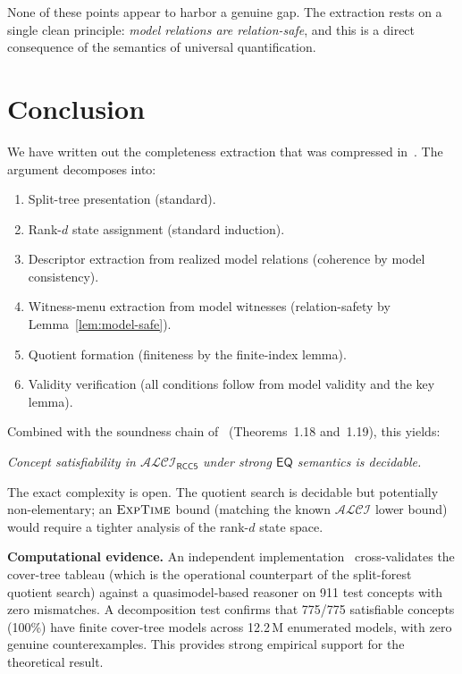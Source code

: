 \documentclass[11pt]{article}
\theoremstyle{definition}
\theoremstyle{remark}
\newcommand{\EQ}{\mathsf{EQ}}
\newcommand{\ALCIRCC}[1]{\mathcal{ALCI}_{\mathsf{RCC#1}}}
\begin{document}
None of these points appear to harbor a genuine gap.  The extraction
rests on a single clean principle: \emph{model relations are
relation-safe}, and this is a direct consequence of the semantics of
universal quantification.


\section{Conclusion}
\label{sec:conclusion}

We have written out the completeness extraction that was compressed
in~\cite{SplitForest}.  The argument decomposes into:
\begin{enumerate}
\item Split-tree presentation (standard).
\item Rank-$d$ state assignment (standard induction).
\item Descriptor extraction from realized model relations
  (coherence by model consistency).
\item Witness-menu extraction from model witnesses
  (relation-safety by Lemma~\ref{lem:model-safe}).
\item Quotient formation (finiteness by the finite-index lemma).
\item Validity verification (all conditions follow from model
  validity and the key lemma).
\end{enumerate}

Combined with the soundness chain of~\cite{SplitForest}
(Theorems~1.18 and~1.19), this yields:

\begin{center}
\emph{Concept satisfiability in $\ALCIRCC{5}$ under strong $\EQ$
semantics is decidable.}
\end{center}

The exact complexity is open.  The quotient search is decidable but
potentially non-elementary; an $\textsc{ExpTime}$ bound (matching
the known $\mathcal{ALCI}$ lower bound) would require a tighter
analysis of the rank-$d$ state space.

\medskip
\noindent\textbf{Computational evidence.}\;
An independent implementation~\cite{ClaudeImpl} cross-validates
the cover-tree tableau (which is the operational counterpart of the
split-forest quotient search) against a quasimodel-based reasoner
on 911 test concepts with zero mismatches.  A decomposition test
confirms that 775/775 satisfiable concepts (100\%) have finite
cover-tree models across 12.2\,M enumerated models, with zero
genuine counterexamples.  This provides strong empirical support for
the theoretical result.
\end{document}
